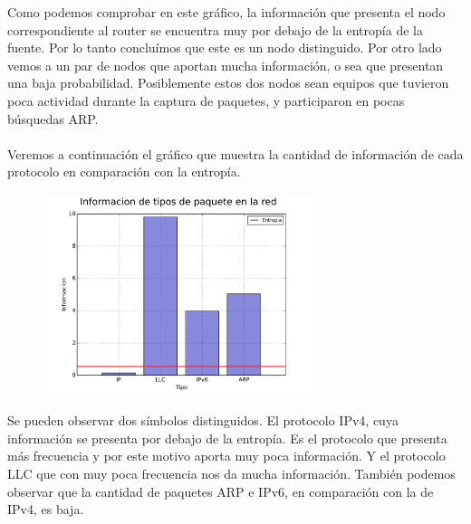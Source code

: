 Como podemos comprobar en este gráfico, la información que presenta el nodo correspondiente al router se encuentra muy por debajo de la entropía de la fuente. Por lo tanto concluímos que este es un nodo distinguido. Por otro lado vemos a un par de nodos que aportan mucha información, o sea que presentan una baja probabilidad. Posiblemente estos dos nodos sean equipos que tuvieron poca actividad durante la captura de paquetes, y participaron en pocas búsquedas ARP.
\\\\
Veremos a continuación el gráfico que muestra la cantidad de información de cada protocolo en comparación con la entropía.

\begin{figure}[ht!]
  \centering
   \includegraphics[width=0.7\textwidth]{graficos/laboral_information_bars_type.png}
  \caption{}
  \label{fig:laboral_information_bars_type}
\end{figure}

Se pueden observar dos símbolos distinguidos. El protocolo IPv4, cuya información se presenta por debajo de la entropía. Es el protocolo que presenta más frecuencia y por este motivo aporta muy poca información.
Y el protocolo LLC que con muy poca frecuencia nos da mucha información.
También podemos observar que la cantidad de paquetes ARP e IPv6, en comparación con la de IPv4, es baja.